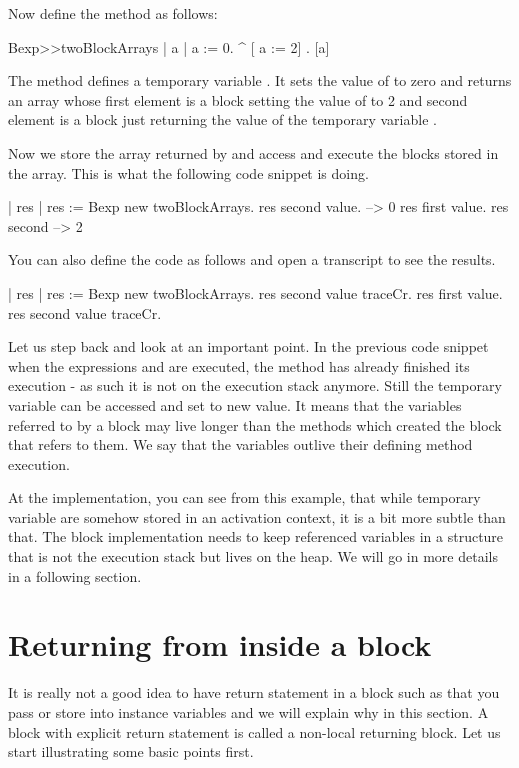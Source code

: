 \documentclass[a4paper,10pt,twoside]{book}
\begin{document}
Now define the method  as follows:

\begin{code}{}
Bexp>>twoBlockArrays
	| a |
	a := 0.
	^ {[ a := 2] . [a]}
\end{code}

The method  defines a temporary variable . It sets the value of 
to zero and returns an array whose first element is a block setting the value of  to 2 and second element is a block just returning the value of the temporary variable .

Now we store the array returned by  and access and execute the blocks stored in the array. This is what the following code snippet is doing.

\begin{code}{}
| res |
res := Bexp new twoBlockArrays.
res second value.
     --> 0
res first value.
res second
     --> 2
\end{code}

You can also define the code as follows and open a transcript to see the results.

\begin{code}
| res |
res := Bexp new twoBlockArrays.
res second value traceCr.
res first value.
res second value traceCr.
\end{code}

Let us step back and look at an important point.
In the previous code snippet when the expressions  and  are executed, the method  has already finished its execution - as such it is not on the execution stack anymore.  Still the temporary variable  can be accessed and set to new value. It means that the variables referred to by a block may live longer than the methods which created the block that refers to them. We say that the variables outlive their defining method execution.

At the implementation, you can see from this example, that while temporary variable are somehow stored in an activation context, it is a bit more subtle than that. The block implementation needs to keep referenced variables in a structure that is not the execution stack but lives on the heap. We will go in more details in a following section.


\section{Returning from inside a block}
It is really not a good idea to have return statement in a block such as \ct{[^ 33]} that you pass or store into instance variables and we will explain why in this section. A block with explicit return statement is called a non-local returning block. Let us start illustrating some basic points first.
\end{document}
